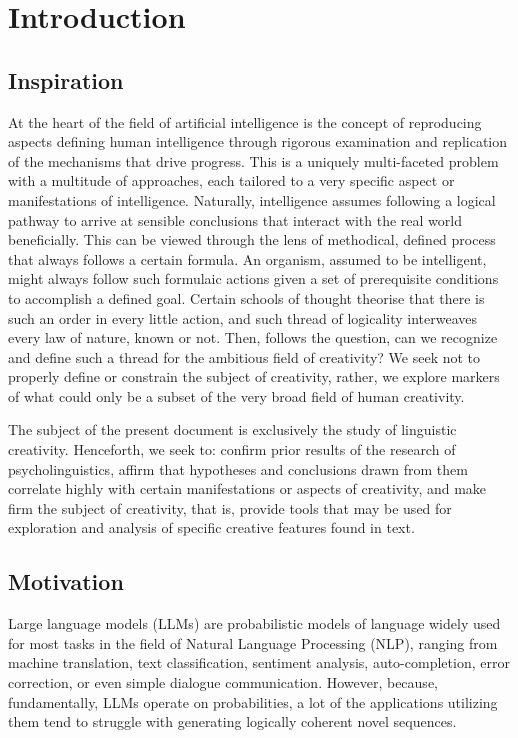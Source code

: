\chapter{Introduction}
\label{chap:intro}

\section{Inspiration}
At the heart of the field of artificial intelligence is the concept of reproducing aspects defining human intelligence through rigorous examination and replication of the mechanisms that drive progress. This is a uniquely multi-faceted problem with a multitude of approaches, each tailored to a very specific aspect or manifestations of intelligence. Naturally, intelligence assumes following a logical pathway to arrive at sensible conclusions that interact with the real world beneficially. This can be viewed through the lens of methodical, defined process that always follows a certain formula. An organism, assumed to be intelligent, might always follow such formulaic actions given a set of prerequisite conditions to accomplish a defined goal. Certain schools of thought theorise that there is such an order in every little action, and such thread of logicality interweaves every law of nature, known or not. Then, follows the question, can we recognize and define such a thread for the ambitious field of creativity? We seek not to properly define or constrain the subject of creativity, rather, we explore markers of what could only be a subset of the very broad field of human creativity.

The subject of the present document is exclusively the study of linguistic creativity. Henceforth, we seek to: confirm prior results of the research of psycholinguistics, affirm that hypotheses and conclusions drawn from them correlate highly with certain manifestations or aspects of creativity, and make firm the subject of creativity, that is, provide tools that may be used for exploration and analysis of specific creative features found in text.

\section{Motivation}

Large language models (LLMs) are probabilistic models of language widely used for most tasks in the field of Natural Language Processing (NLP), ranging from machine translation, text classification, sentiment analysis, auto-completion, error correction, or even simple dialogue communication. However, because, fundamentally, LLMs operate on probabilities, a lot of the applications utilizing them tend to struggle with generating logically coherent novel sequences. 

